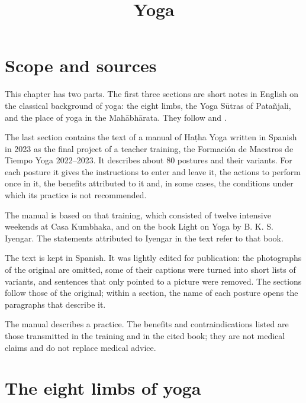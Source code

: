 



\title{Yoga}
\maketitle

\label{section-phantom}

\tableofcontents

\section{Scope and sources}
\label{section-scope-and-sources}

This chapter has two parts. The first three
sections are short notes in English on the
classical background of yoga: the eight limbs,
the Yoga Sūtras of Patañjali, and the place of
yoga in the Mahābhārata. They follow
\cite{bryant-yoga-sutras} and
\cite{van-buitenen-mahabharata-1}.

The last section contains the text of a manual of
Haṭha Yoga written in Spanish in 2023 as the
final project of a teacher training, the
Formación de Maestros de Tiempo Yoga
2022--2023. It describes about 80 postures
and their variants. For each posture it gives
the instructions to enter and leave it, the
actions to perform once in it, the benefits
attributed to it and, in some cases, the
conditions under which its practice is not
recommended.

The manual is based on that training, which
consisted of twelve intensive weekends at
Casa Kumbhaka, and on the book Light on Yoga
by B. K. S. Iyengar. The statements
attributed to Iyengar in the text refer to
that book.

The text is kept in Spanish. It was lightly
edited for publication: the photographs of
the original are omitted, some of their
captions were turned into short lists of
variants, and sentences that only pointed to
a picture were removed. The sections follow
those of the original; within a section, the
name of each posture opens the paragraphs
that describe it.

The manual describes a practice. The benefits
and contraindications listed are those
transmitted in the training and in the cited
book; they are not medical claims and do not
replace medical advice.

\section{The eight limbs of yoga}
\label{section-eight-limbs}

